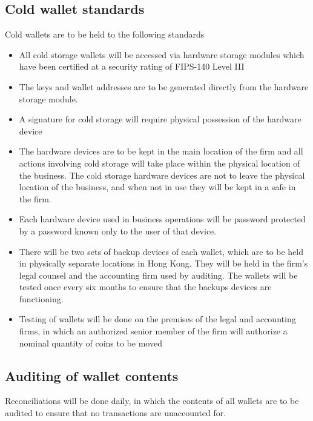 \subsection{Cold wallet standards}

Cold wallets are to be held to the following standards

\begin{itemize}
  \item All cold storage wallets will be accessed via hardware storage
    modules which have been certified at a security rating of
    FIPS-140 Level III
 \item The keys and wallet addresses are to be generated directly from
   the hardware storage module.
 \item A signature for cold storage will require physical possession
   of the hardware device
 \item The hardware devices are to be kept in the main location of the
   firm and all actions involving cold storage will take place within
   the physical location of the business.  The cold storage hardware
   devices are not to leave the physical location of the business, and
   when not in use they will be kept in a safe in the firm.
 \item Each hardware device used in business operations will be
   password protected by a password known only to the user of that
   device.
 \item There will be two sets of backup devices of each wallet, which
   are to be held in physically separate locations in Hong Kong.
   They will be held in the firm's legal counsel and the accounting
   firm used by auditing.  The wallets will be tested once every six months to ensure that the backups devices are functioning.
 \item Testing of wallets will be done on the premises of the legal and accounting firms, in which an authorized senior member of the firm will authorize a nominal quantity of coins to be moved
\end{itemize}

\subsection{Auditing of wallet contents}

Reconciliations will be done daily, in which the contents of
all wallets are to be audited to ensure that no transactions are
unaccounted for.

